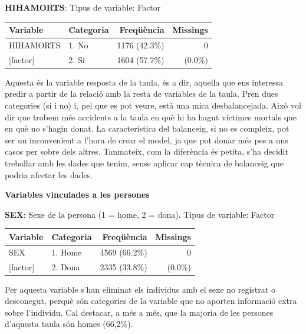 \documentclass[12pt,longbibliography]{article}
\theoremstyle{definition}
\theoremstyle{remark}
\begin{document}
\textbf{HIHAMORTS}:  Tipus de variable: Factor


\begin{table}[H]
\centering
\begin{tabular}{llll}
\hline
Variable & \multicolumn{1}{r}{Categoria} & \multicolumn{1}{r}{Freqüència} & \multicolumn{1}{r}{Missings} \\ \hline
HIHAMORTS    & 1. No  & 1176 (42.3\%) & \multicolumn{1}{r}{0} \\
{[}factor{]} & 2. Sí   & 1604 (57.7\%) & \multicolumn{1}{r}{(0.0\%)}          \\\hline
\end{tabular}
\end{table}

Aquesta és la variable resposta de la taula, és a dir, aquella que ens interessa predir a partir de la relació amb la resta de variables de la taula. Pren dues categories (sí i no) i, pel que es pot veure, està una mica desbalancejada. Això vol dir que trobem més accidents a la taula en què hi ha hagut víctimes mortals que en què no s'hagin donat. La característica del balanceig, si no es compleix, pot ser un inconvenient a l'hora de crear el model, ja que pot donar més pes a uns casos per sobre dels altres. Tanmateix, com la diferència és petita, s'ha decidit treballar amb les dades que tenim, sense aplicar cap tècnica de balanceig que podria afectar les dades.


\textbf{Variables vinculades a les persones}


\textbf{SEX}: Sexe de la persona (1 = home, 2 = dona). Tipus de variable: Factor


\begin{table}[H]
\centering
\begin{tabular}{llll}
\hline
Variable & \multicolumn{1}{r}{Categoria} & \multicolumn{1}{r}{Freqüència} & \multicolumn{1}{r}{Missings} \\ \hline
SEX    & 1. Home  & 4569 (66.2\%) & \multicolumn{1}{r}{0} \\
{[}factor{]} & 2. Dona   & 2335 (33.8\%) & \multicolumn{1}{r}{(0.0\%)}          \\\hline
\end{tabular}
\end{table}

Per aquesta variable s'han eliminat els individus amb el sexe no registrat o desconegut, perquè són categories de la variable que no aporten informació extra sobre l'individu. Cal destacar, a més a més, que la majoria de les persones d'aquesta taula són homes (66,2\%). 
\end{document}
